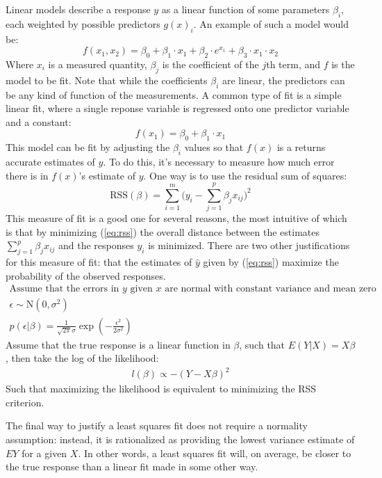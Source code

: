 \documentclass[11pt,a4paper,article]{memoir} %
\begin{document}
  Linear models describe a response $y$ as a linear function of some parameters $\beta_i$, each weighted by possible predictors $g(x)_i$. An example of such a model would be:
\begin{equation}
	f(x_1, x_2) = \beta_0 + \beta_1 \cdot x_1 + \beta_2 \cdot e^{x_1}+ \beta_3 \cdot x_1 \cdot x_2
\end{equation}
Where  $x_i$ is a measured quantity, $\beta_j$ is the coefficient of the $j$th term, and $f$ is the model to be fit. Note that while the coefficients $\beta_i$ are linear, the predictors can be any kind of function of the measurements. A common type of fit is a simple linear fit, where a single reponse variable is regressed onto one predictor variable and a constant:
\begin{equation}
	f(x_1) = \beta_0 + \beta_1 \cdot x_1
\end{equation}
This model can be fit by adjusting the $\beta_i$ values so that $f(x)$ is a returns accurate estimates of $y$. To do this, it's necessary to measure how much error there is in $f(x)$'s estimate of $y$. One way is to use the residual sum of squares:
\begin{equation}
	\text{RSS}(\beta) = \sum_{i = 1}^m \Big(y_i - \sum_{j = 1}^p \beta_j x_{ij} \Big)^2
	\label{eq:rss}
\end{equation}
This measure of fit is a good one for several reasons, the most intuitive of which is that by minimizing (\ref{eq:rss}) the overall distance between the estimates $\sum_{j = 1}^p \beta_j x_{ij}$ and the responses $y_i$ is minimized. There are two other justifications for this measure of fit: that the estimates  of $\hat{y}$ given by (\ref{eq:rss}) maximize the probability of the observed responses.
\begin{gather}
	\text{Assume that the errors in $y$ given $x$ are normal with constant variance and mean zero}\\
	\epsilon \sim \text{N}(0, \sigma^2) \\
	p(\epsilon|\beta) = \frac{1}{\sqrt{2\pi}\sigma} \exp (-\frac{\epsilon^2}{2\sigma^2})
\end{gather}
Assume that the true response is a linear function in $\beta$, such that $E(Y|X) = X\beta$, then take the log of the likelihood:
\begin{gather}
	l(\beta) \propto -(Y - X\beta)^2
\end{gather}
Such that maximizing the likelihood is equivalent to minimizing the RSS criterion.

The final way to justify a least squares fit does not require a normality assumption: instead, it is rationalized as providing the lowest variance estimate of $EY$ for a given $X$. In other words, a least squares fit will, on average, be closer to the true response than a linear fit made in some other way.
\end{document}
